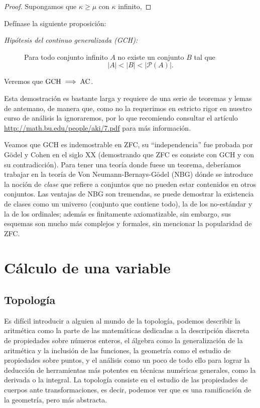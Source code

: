 \documentclass[11pt,oneside,a4paper]{book}
\renewcommand{\P}{\mathcal{P}}
\begin{document}
\begin{proof}
Supongamos que $\kappa\geq\mu$ con $\kappa$ infinito, 
\end{proof}
\begin{thm}
Defínase la siguiente proposición:
\begin{description}
\item[\color{thm}\itshape\sffamily Hipótesis del continuo generalizada (GCH):] Para todo conjunto infinito $A$ no existe un conjunto $B$ tal que
$$|A|\lt|B|\lt|\P(A)|.$$
\end{description}
Veremos que $\rm GCH\implies AC$.
\end{thm}
Esta demostración es bastante larga y requiere de una serie de teoremas y lemas de antemano, de manera que, como no la requerimos en estricto rigor en nuestro curso de análisis la ignoraremos, por lo que recomiendo consultar el artículo \url{http://math.bu.edu/people/aki/7.pdf} para más información.

Veamos que GCH es indemostrable en ZFC, su ``independencia'' fue probada por Gödel y Cohen en el siglo XX (demostrando que ZFC es consiste con GCH y con su contradicción). Para tener una teoría donde fuese un teorema, deberíamos trabajar en la teoría de Von Neumann-Bernays-Gödel (NBG) dónde se introduce la noción de \textit{clase} que refiere a conjuntos que no pueden estar contenidos en otros conjuntos. Las ventajas de NBG son tremendas, se puede demostrar la existencia de clases como un universo (conjunto que contiene todo), la de los no-estándar y la de los ordinales; además es finitamente axiomatizable, sin embargo, sus esquemas son mucho más complejos y formales, sin mencionar la popularidad de ZFC.

\part{Cálculo de una variable}
\chapter{Topología}
Es difícil introducir a alguien al mundo de la topología, podemos describir la aritmética como la parte de las matemáticas dedicadas a la descripción discreta de propiedades sobre números enteros, el álgebra como la generalización de la aritmética y la inclusión de las funciones, la geometría como el estudio de propiedades sobre puntos, y el análisis como un poco de todo ello para lograr la deducción de herramientas más potentes en técnicas numéricas generales, como la derivada o la integral. La topología consiste en el estudio de las propiedades de cuerpos ante transformaciones, es decir, podemos ver que es una ramificación de la geometría, pero más abstracta.
\end{document}
